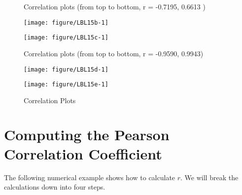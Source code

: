 \documentclass[11pt]{book}\usepackage[]{graphicx}\usepackage[]{color}
\begin{document}
\begin{figure}

\caption{Correlation Plots }

\begin{minipage}[ht]{7.1cm}

Correlation plots (from top to bottom, r = -0.7195, 0.6613 )




{\centering \texttt{[image: figure/LBL15b-1]} 

}





{\centering \texttt{[image: figure/LBL15c-1]} 

}




\end{minipage} \hfill
\begin{minipage}[ht]{7.1cm}


Correlation plots (from top to bottom, r = -0.9590, 0.9943)




{\centering \texttt{[image: figure/LBL15d-1]} 

}





{\centering \texttt{[image: figure/LBL15e-1]} 

}



\end{minipage}

\end{figure}

\section{Computing the Pearson Correlation Coefficient}

The following numerical example shows how to calculate $r$.  We will break the calculations down into four steps.
\end{document}

